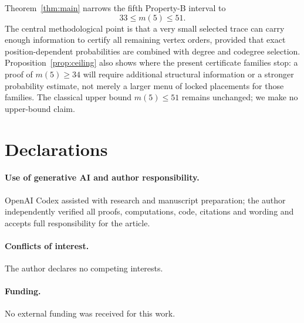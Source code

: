 \documentclass[11pt]{article}
\theoremstyle{remark}
\begin{document}
Theorem~\ref{thm:main} narrows the fifth Property-B interval to
\[
33\le m(5)\le51.
\]
The central methodological point is that a very small selected trace can
carry enough information to certify all remaining vertex orders, provided
that exact position-dependent probabilities are combined with degree and
codegree selection.  Proposition~\ref{prop:ceiling} also shows where the
present certificate families stop: a proof of $m(5)\ge34$ will require
additional structural information or a stronger probability estimate, not
merely a larger menu of locked placements for those families.  The classical
upper bound $m(5)\le51$ remains unchanged; we make no upper-bound claim.

\section*{Declarations}

\paragraph{Use of generative AI and author responsibility.}
OpenAI Codex assisted with research and manuscript preparation; the author
independently verified all proofs, computations, code, citations and wording
and accepts full responsibility for the article.

\paragraph{Conflicts of interest.}
The author declares no competing interests.

\paragraph{Funding.}
No external funding was received for this work.



\end{document}
